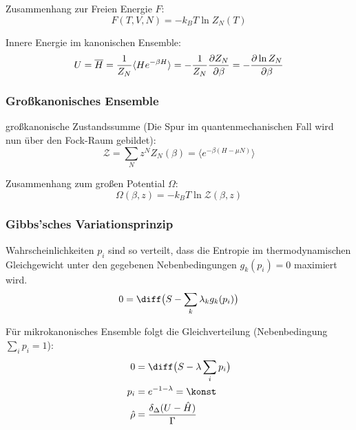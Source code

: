 \documentclass[11pt]{article}
\numberwithin{equation}{section}
\begin{document}
        Zusammenhang zur Freien Energie $F$:
        \begin{equation}
          F(T, V, N) = -k_B T \ln{Z_N(T)}
        \end{equation}


        Innere Energie im kanonischen Ensemble:
        \begin{equation}
          U = \overline{H} = \frac{1}{Z_N}\langle He^{-\beta H}\rangle = -\frac{1}{Z_N}\frac{\partial Z_N}{\partial \beta} = -\frac{\partial \ln Z_N}{\partial \beta}
        \end{equation}

      \subsubsection{Großkanonisches Ensemble}
        großkanonische Zustandssumme (Die Spur im quantenmechanischen Fall wird nun über den Fock-Raum gebildet):
        \begin{equation}
          \mathcal{Z} = \sum_N z^N Z_N(\beta) = \langle e^{-\beta(H-\mu N)} \rangle
        \end{equation}

        Zusammenhang zum großen Potential $\Omega$:
        \begin{equation}
          \Omega(\beta,z) = -k_B T \ln \mathcal{Z}(\beta,z)
        \end{equation}


      \subsubsection{Gibbs'sches Variationsprinzip}
        Wahrscheinlichkeiten $p_i$ sind so verteilt, dass die Entropie im thermodynamischen Gleichgewicht unter den gegebenen Nebenbedingungen $g_k(p_i) = 0$ maximiert wird.
        \begin{equation}
          0 = \diff \big( S - \sum_k \lambda_k g_k(p_i) \big)
        \end{equation}

        Für mikrokanonisches Ensemble folgt die Gleichverteilung (Nebenbedingung $\sum_i p_i = 1$):
        \begin{equation}
          \begin{aligned}
            0 &= \diff \big( S - \lambda \sum_i p_i \big) \\
            p_i &= e^{-1-\lambda} = \konst \\
            \hat{\rho} &= \frac{\delta_\Delta(U-\hat{H})}{\Gamma} \\
          \end{aligned}
        \end{equation}
\end{document}
